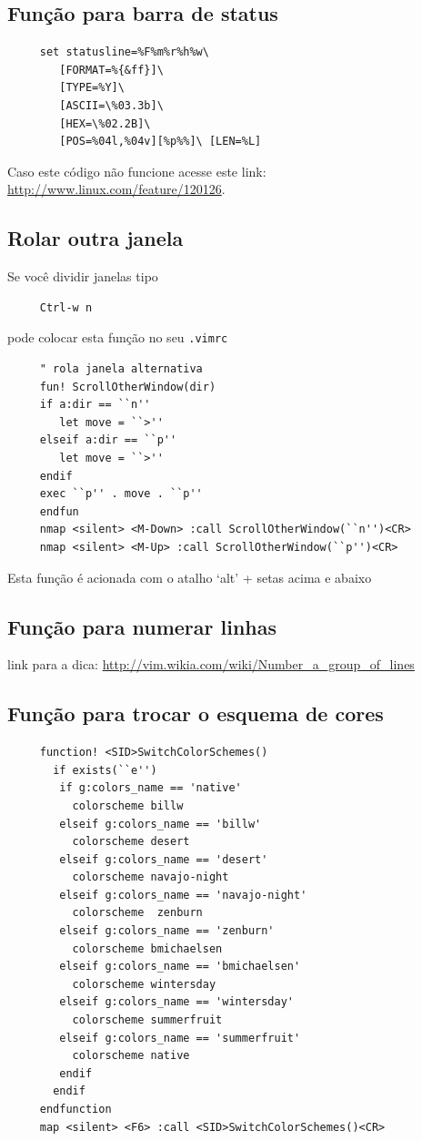\documentclass[10pt,a4paper,openany]{book}
\begin{document}
\subsection{Função para barra de status}\label{Função para barra de status}

\begin{verbatim}
     set statusline=%F%m%r%h%w\
        [FORMAT=%{&ff}]\
        [TYPE=%Y]\
        [ASCII=\%03.3b]\
        [HEX=\%02.2B]\
        [POS=%04l,%04v][%p%%]\ [LEN=%L]
\end{verbatim}
Caso este código não funcione acesse este link: \url{http://www.linux.com/feature/120126}.


\subsection{Rolar outra janela}\label{Rolar outra janela}

Se você dividir janelas tipo

\begin{verbatim}
     Ctrl-w n
\end{verbatim}

pode colocar esta função no seu \verb|.vimrc|

\begin{verbatim}
     " rola janela alternativa
     fun! ScrollOtherWindow(dir)
     if a:dir == ``n''
        let move = ``>''
     elseif a:dir == ``p''
        let move = ``>''
     endif
     exec ``p'' . move . ``p''
     endfun
     nmap <silent> <M-Down> :call ScrollOtherWindow(``n'')<CR>
     nmap <silent> <M-Up> :call ScrollOtherWindow(``p'')<CR>
\end{verbatim}

Esta função é acionada com o atalho `alt' + setas acima e abaixo

\subsection{Função para numerar linhas}\label{Função para numerar linhas}
link para a dica: \url{http://vim.wikia.com/wiki/Number_a_group_of_lines}

\subsection{Função para trocar o esquema de cores}

\begin{verbatim}
     function! <SID>SwitchColorSchemes()
       if exists(``e'')
        if g:colors_name == 'native'
          colorscheme billw
        elseif g:colors_name == 'billw'
          colorscheme desert
        elseif g:colors_name == 'desert'
          colorscheme navajo-night
        elseif g:colors_name == 'navajo-night'
          colorscheme  zenburn
        elseif g:colors_name == 'zenburn'
          colorscheme bmichaelsen
        elseif g:colors_name == 'bmichaelsen'
          colorscheme wintersday
        elseif g:colors_name == 'wintersday'
          colorscheme summerfruit
        elseif g:colors_name == 'summerfruit'
          colorscheme native
        endif
       endif
     endfunction
     map <silent> <F6> :call <SID>SwitchColorSchemes()<CR>
\end{verbatim}
\end{document}
